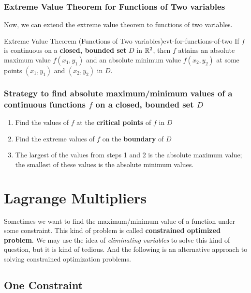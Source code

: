 \documentclass[math,code]{amznotes}
\theoremstyle{remark}
\begin{document}
\subsubsection{Extreme Value Theorem for Functions of Two variables}
Now, we can extend the extreme value theorem to functions of two variables.
\begin{thmbox}{Extreme Value Theorem (Functions of Two variables)}{evt-for-functions-of-two}
    If $f$ is continuous on a {\color{red} \textbf{closed, bounded set}} $D$ in $\mathbb{R}^2$, then $f$ attains an absolute maximum value $f(x_1,y_1)$ and an absolute minimum value $f(x_2,y_2)$ at some points $(x_1,y_1)$ and $(x_2,y_2)$ in $D$.  
\end{thmbox}
\subsubsection{Strategy to find absolute maximum/minimum values of a continuous functions $f$ on a closed, bounded set $D$}
\begin{enumerate}
    \item Find the values of $f$ at the {\color{red} \textbf{critical points}} of $f$ in $D$
    \item Find the extreme values of $f$ on the {\color{red} \textbf{boundary}} of $D$
    \item The largest of the values from steps 1 and 2 is the absolute maximum value; the smallest of these values is the absolute minimum values.
\end{enumerate}
\section{Lagrange Multipliers}
Sometimes we want to find the maximum/minimum value of a function under some constraint. This kind of problem is called \textbf{constrained optimized problem}. We may use the idea of \textit{eliminating variables} to solve this kind of question, but it is kind of tedious. And the following is an alternative approach to solving constrained optimization problems.
\subsection{One Constraint}
\end{document}

